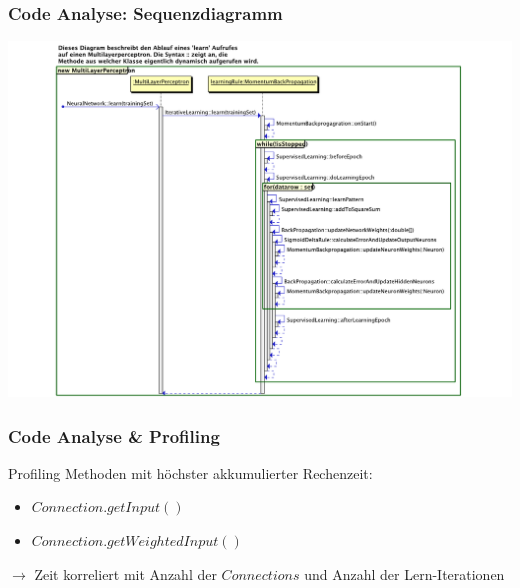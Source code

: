 \documentclass[18pt]{beamer}
\begin{document}
	\begin{frame}[c]\frametitle{Code Analyse: Sequenzdiagramm}
			\begin{center}
			  \includegraphics[scale=0.4]{images/Learn.pdf} 
			\end{center}
	\end {frame}
	
	\begin{frame}[c]\frametitle{Code Analyse \& Profiling}
		\begin{block}{Profiling}
			Methoden mit höchster akkumulierter Rechenzeit:
			\begin{itemize}
				\item $Connection.getInput()$
				\item $Connection.getWeightedInput()$
		    \end{itemize}
			$\rightarrow$ Zeit korreliert mit Anzahl der $Connections$ und Anzahl der Lern-Iterationen
		\end{block}
	\end {frame}			
	
\end{document}
